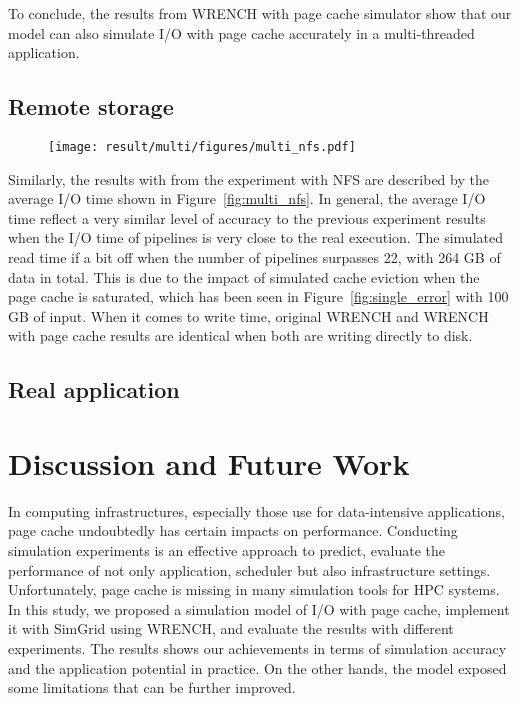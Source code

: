 \documentclass[conference]{IEEEtran}
\begin{document}
			To conclude, the results from WRENCH with page cache simulator show that 
			our model can also simulate I/O with page cache accurately in a 
			multi-threaded application.  
			
		\subsection{Remote storage}
		
			\begin{figure*}		
			\begin{subfigure}{\linewidth}
				\centering
   				\texttt{[image: result/multi/figures/multi\_nfs.pdf]}
			\end{subfigure}		
			\caption{I/O time of concurrent pipelines with NFS}
			\label{fig:multi_nfs}
			\end{figure*}
		
			Similarly, the results with from the experiment with NFS are described 
			by the average I/O time shown in Figure~\ref{fig:multi_nfs}.
			In general, the average I/O time reflect a very similar level of accuracy 
			to the previous experiment results when the I/O time of pipelines 
			is very close to the real execution. 
			The simulated read time if a bit off when the number of pipelines 
			surpasses 22, with 264 GB of data in total. 
			This is due to the impact of simulated cache eviction when 
			the page cache is saturated, which has been seen in 
			Figure~\ref{fig:single_error} with 100 GB of input. 
			When it comes to write time, original WRENCH and WRENCH with page cache 
			results are identical when both are writing directly to disk.
		
		\subsection{Real application}

	\section{Discussion and Future Work}
	\label{discussion}			
			In computing infrastructures, especially those use for data-intensive applications, 
			page cache undoubtedly has certain impacts on performance. 
			Conducting simulation experiments is an effective approach to predict, 
			evaluate the performance of not only application, scheduler but also 
			infrastructure settings. 
			Unfortunately, page cache is missing in many simulation tools for HPC systems. 
			In this study, we proposed a simulation model of I/O with page cache, 
			implement it with SimGrid using WRENCH, and evaluate the results 
			with different experiments. 
			The results shows our achievements in terms of simulation accuracy 
			and the application potential in practice. 
			On the other hands, the model exposed some limitations that can be 
			further improved.
			
\end{document}
